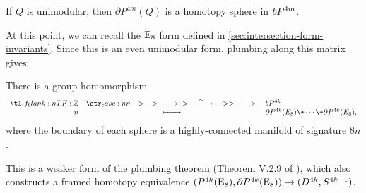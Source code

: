 \begin{theorem}
	If $Q$ is unimodular, then $\partial P^{4m}(Q)$ is a homotopy sphere in $bP^{4m}$.
\end{theorem}

At this point, we can recall the $\mathrm{E}_8$ form defined in \cref{sec:intersection-form-invariants}. Since this is an even unimodular form, plumbing along this matrix gives:
\begin{theorem}\label{thm:plumbing-theorem}
	There is a group homomorphism
	\[
		\lkxfunc{}{\Z}{\bP^{4k}}{n}{\partial P^{4k}(E_8)\+\cdots\+\partial P^{4k}(E_8),}
	\]
	where the boundary of each sphere is a highly-connected manifold of signature $8n$.
\end{theorem}

This is a weaker form of the plumbing theorem (Theorem V.2.9 of \cite{browder1972surgery}), which also constructs a framed homotopy equivalence $(P^{4k}(\mathrm{E}_8), \partial P^{4k}(\mathrm{E}_8)) \to (D^{4k}, S^{4k-1})$.

